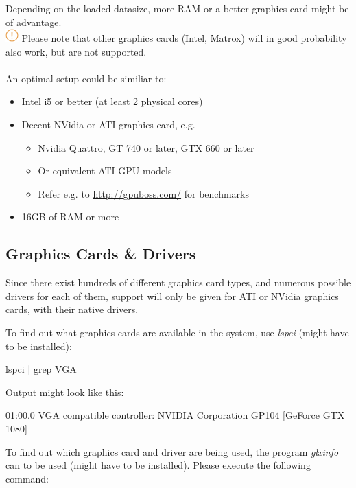 Depending on the loaded datasize, more RAM or a better graphics card might be of advantage. \\

\includegraphics[width=0.5cm]{../../data/icons/hint.png} Please note that other graphics cards (Intel, Matrox) will in good probability also work, but are not supported. \\\\

An optimal setup could be similiar to:

\begin{itemize}  
\item Intel i5 or better (at least 2 physical cores)
\item Decent NVidia or ATI graphics card, e.g.
\begin{itemize}  
\item Nvidia Quattro, GT 740 or later, GTX 660 or later
\item Or equivalent ATI GPU models
\item Refer e.g. to \url{http://gpuboss.com/} for benchmarks
\end{itemize}
\item 16GB of RAM or more
\end{itemize}


\subsection{Graphics Cards \& Drivers}
\label{sec:graphics_installation}

Since there exist hundreds of different graphics card types, and numerous possible drivers for each of them, support will only be given for ATI or NVidia graphics cards, with their native drivers.

To find out what graphics cards are available in the system, use \textit{lspci} (might have to be installed):

\begin{cverbatim}
lspci | grep VGA
\end{cverbatim}

Output might look like this:

\begin{cverbatim}
01:00.0 VGA compatible controller: NVIDIA Corporation GP104 [GeForce GTX 1080]
\end{cverbatim}

To find out which graphics card and driver are being used, the program \textit{glxinfo} can to be used (might have to be installed). Please execute the following command:

